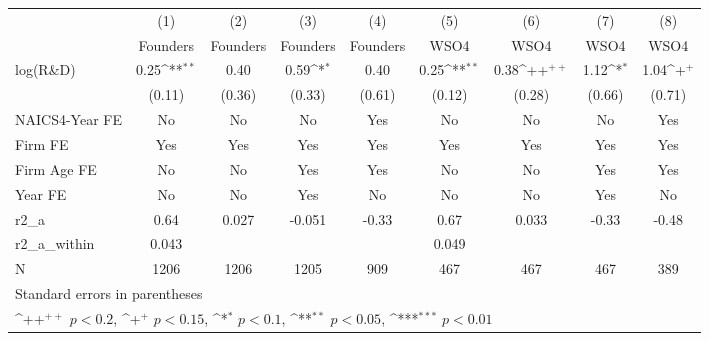 {
\def\sym#1{\ifmmode^{#1}\else\(^{#1}\)\fi}
\begin{tabular}{l*{8}{c}}
\toprule
                    &\multicolumn{1}{c}{(1)}&\multicolumn{1}{c}{(2)}&\multicolumn{1}{c}{(3)}&\multicolumn{1}{c}{(4)}&\multicolumn{1}{c}{(5)}&\multicolumn{1}{c}{(6)}&\multicolumn{1}{c}{(7)}&\multicolumn{1}{c}{(8)}\\
                    &\multicolumn{1}{c}{Founders}&\multicolumn{1}{c}{Founders}&\multicolumn{1}{c}{Founders}&\multicolumn{1}{c}{Founders}&\multicolumn{1}{c}{WSO4}&\multicolumn{1}{c}{WSO4}&\multicolumn{1}{c}{WSO4}&\multicolumn{1}{c}{WSO4}\\
\midrule
log(R\&D)           &        0.25\sym{**} &        0.40         &        0.59\sym{*}  &        0.40         &        0.25\sym{**} &        0.38\sym{++} &        1.12\sym{*}  &        1.04\sym{+}  \\
                    &      (0.11)         &      (0.36)         &      (0.33)         &      (0.61)         &      (0.12)         &      (0.28)         &      (0.66)         &      (0.71)         \\
\addlinespace
NAICS4-Year FE      &          No         &          No         &          No         &         Yes         &          No         &          No         &          No         &         Yes         \\
\addlinespace
Firm FE             &         Yes         &         Yes         &         Yes         &         Yes         &         Yes         &         Yes         &         Yes         &         Yes         \\
\addlinespace
Firm Age FE         &          No         &          No         &         Yes         &         Yes         &          No         &          No         &         Yes         &         Yes         \\
\addlinespace
Year FE             &          No         &          No         &         Yes         &          No         &          No         &          No         &         Yes         &          No         \\
\midrule
r2\_a                &        0.64         &       0.027         &      -0.051         &       -0.33         &        0.67         &       0.033         &       -0.33         &       -0.48         \\
r2\_a\_within         &       0.043         &                     &                     &                     &       0.049         &                     &                     &                     \\
N                   &        1206         &        1206         &        1205         &         909         &         467         &         467         &         467         &         389         \\
\bottomrule
\multicolumn{9}{l}{\footnotesize Standard errors in parentheses}\\
\multicolumn{9}{l}{\footnotesize \sym{++} \(p<0.2\), \sym{+} \(p<0.15\), \sym{*} \(p<0.1\), \sym{**} \(p<0.05\), \sym{***} \(p<0.01\)}\\
\end{tabular}
}
